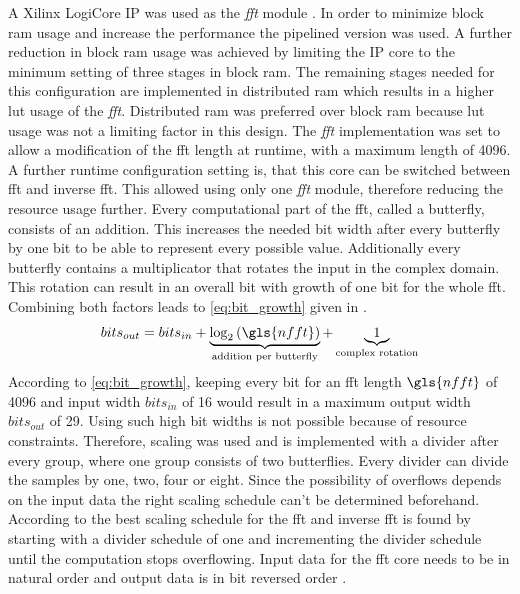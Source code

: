 \documentclass[12pt,a4paper,parskip=full,abstract=true,BCOR=12mm,twoside,open=right]{scrreprt}
\def\device#1{\mbox{\textit{#1}}}
\begin{document}
A Xilinx LogiCore IP was used as the \device{fft} module \cite{xilinx_fft}. In
order to minimize block \gls{ram} usage and increase the performance the
pipelined version was used. A further reduction in block \gls{ram} usage was achieved
by limiting the IP core to the minimum setting of three stages in block \gls{ram}. The
remaining stages needed for this configuration are implemented in distributed \gls{ram} which
results in a higher \gls{lut} usage of the \device{fft}\cite{xilinx_fft,virtex5}. Distributed
\gls{ram} was preferred over block \gls{ram} because \gls{lut} usage was not a limiting factor
in this design. The \device{fft} implementation was set to allow a modification of the
\gls{fft} length at runtime, with a maximum length of 4096. A further runtime configuration
setting is, that this core can be switched between \gls{fft} and inverse \gls{fft}. This
allowed using only one \device{fft} module, therefore reducing the resource usage further. Every
computational part of the \gls{fft}, called a butterfly, consists of an addition. This
increases the needed bit width after every butterfly by one bit to be able to represent every
possible value. Additionally every butterfly contains a multiplicator that rotates the input
in the complex domain. This rotation can result in an overall bit with growth of one bit for the
whole \gls{fft}. Combining both factors leads to \cref{eq:bit_growth} given in \cite{xilinx_fft}.
\begin{equation}
    \label{eq:bit_growth}
    bits_{out} = bits_{in} + \underbrace{\log_2\left(\gls{nfft}\right)}_{\text{addition per butterfly}} + \underbrace{1}_{\text{complex rotation}}
\end{equation}
According to \cref{eq:bit_growth}, keeping every bit for an \gls{fft} length $\gls{nfft}$ of 4096
and input width $bits_{in}$ of \SI{16}{\bit} would result in a maximum output width $bits_{out}$
of \SI{29}{\bit}. Using such high bit widths is not possible because of resource constraints.
Therefore, scaling was used and is implemented with a divider after every group, where one group
consists of two butterflies. Every divider can divide the samples by one, two, four or eight.
Since the possibility of overflows depends on the input data the right scaling schedule can't
be determined beforehand. According to \cite{xilinx_fft} the best scaling schedule for the
\gls{fft} and inverse \gls{fft} is found by starting with a divider schedule of one and incrementing
the divider schedule until the computation stops overflowing. Input data for the \gls{fft} core
needs to be in natural order and output data is in bit reversed order \cite{xilinx_fft}.
\end{document}
